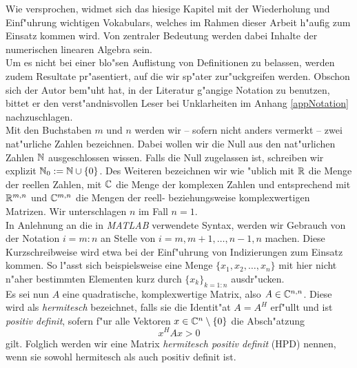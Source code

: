 Wie versprochen, widmet sich das hiesige Kapitel mit der Wiederholung und Einf"uhrung wichtigen Vokabulars, welches im Rahmen dieser Arbeit h"aufig zum Einsatz kommen wird.
Von zentraler Bedeutung werden dabei Inhalte der numerischen linearen Algebra sein.\\

Um es nicht bei einer blo"sen Auflistung von Definitionen zu belassen, werden zudem Resultate pr"asentiert, auf die wir sp"ater zur"uckgreifen werden.
Obschon sich der Autor bem"uht hat,
in der Literatur g"angige Notation zu benutzen, bittet er den
verst"andnisvollen Leser bei Unklarheiten im Anhang \ref{appNotation} nachzuschlagen.\\

Mit den Buchstaben $m$ und $n$ werden wir -- sofern nicht anders vermerkt -- zwei nat"urliche Zahlen bezeichnen. Dabei wollen wir die Null aus den nat"urlichen Zahlen $\mathbb{N}$ ausgeschlossen wissen.
Falls die Null zugelassen ist, schreiben wir explizit $\mathbb{N}_0 := \mathbb{N}\cup\{0\}$.
Des Weiteren bezeichnen wir wie "ublich mit $\mathbb{R}$ die Menge der reellen Zahlen, mit $\mathbb{C}$ die Menge der komplexen Zahlen und entsprechend mit $\mathbb{R}^{m,n}$ und $\mathbb{C}^{m,n}$ die Mengen der reell- beziehungsweise komplexwertigen Matrizen. Wir unterschlagen $n$ im Fall $n=1$.\\

In Anlehnung an die in \emph{MATLAB} verwendete Syntax, werden wir Gebrauch von der Notation $i=m:n$ an Stelle von $i=m,m+1,\ldots,n-1,n$ machen.
Diese Kurzschreibweise wird etwa bei der Einf"uhrung von Indizierungen zum Einsatz kommen.
So l"asst sich beispielsweise eine Menge $\{x_1,x_2,\ldots,x_n\}$ mit hier nicht n"aher bestimmten Elementen kurz durch $\{x_k\}_{k=1:n}$ ausdr"ucken.\\

Es sei nun $A$ eine quadratische, komplexwertige Matrix, also $A\in\mathbb{C}^{n,n}$. Diese wird als \emph{hermitesch} bezeichnet, falls sie die Identit"at $A=A^H$ erf"ullt und ist \emph{positiv definit}, sofern
f"ur alle Vektoren $x\in\mathbb{C}^n \setminus\{0\}$ die Absch"atzung
\[
x^H A x > 0
\]
gilt. Folglich werden wir eine Matrix \emph{hermitesch positiv definit} (HPD)
nennen, wenn sie sowohl hermitesch als auch positiv definit ist.\\


